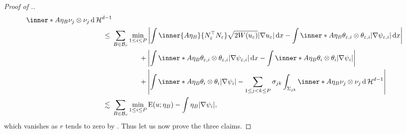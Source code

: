\begin{proof}[Proof of .]
\begin{align*}
{			\inner*{ A \eta_{ B } }
			{ \nu_{ j } \otimes \nu_{ j } }
			\dd{ \hm^{ d - 1 } }
		}
		\\
		\leq{} &
		\sum_{ B \in \mathcal{ B }_{ r } }
		\min_{ 1 \leq i \leq P }
		\abs{ 
			\int
			\inner{ A \eta_{ B } }{ N_{ \varepsilon }^{ \top } N_{ \varepsilon 
			} }
			\sqrt{ 2 W ( u_{ \varepsilon } ) }
			\abs{ \nabla u_{ \varepsilon } }
			\dd{ x }
			-
			\int
			\inner*{ A \eta_{ B } }
			{ \theta_{ \varepsilon , i }\otimes \theta_{ \varepsilon ,i } 
			}
			\abs{ \nabla \psi_{ \varepsilon,  i } }
			\dd{ x }
		}
		\\
		& \quad \quad \quad \;\;\;\!\: +
		\abs{ 
			\int
			\inner*{ A \eta_{ B } }{ \theta_{ \varepsilon ,i } \otimes 
				\theta_{ \varepsilon , i } }
			\abs{ \nabla \psi_{ \varepsilon, i } }
			\dd{ x }
			-
			\int
			\inner*{ A \eta_{ B } }
			{ \theta_{ i } \otimes \theta_{ i } }
			\abs{ \nabla \psi_{ i } }
		}
		\\
		& \quad \quad \quad \;\;\;\!\: +
		\abs{ 
			\int
			\inner*{ A \eta_{ B } }
			{ \theta_{ i } \otimes \theta_{ i } }
			\abs{ \nabla \psi_{ i } }
			-
			\sum_{ 1 \leq j < k \leq P }
			\sigma_{ j k }
			\int_{ \Sigma_{ j k } }
			\inner*{ A \eta_{ B } }
			{ \nu_{ j } \otimes \nu_{ j } }
			\dd{ \hm^{ d - 1 } }
		}
		\\
		\lesssim {} &
		\sum_{ B \in \mathcal{ B }_{ r } }
		\min_{ 1 \leq i \leq P }
		\energy ( u ; \eta_{ B } )
		-
		\int
		\eta_{ B }
		\abs{ \nabla \psi_{ i } },
	\end{align*}
	which vanishes as $ r $ tends to zero by 
	.
	Thus let us now prove the three claims.
	

\end{proof}
